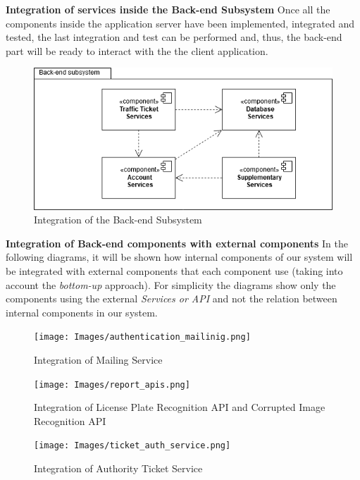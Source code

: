     \noindent\textbf{Integration of services inside the Back-end Subsystem}\newline
Once all the components inside the application server have been implemented, integrated and tested, the last integration and test can be performed and, thus, the back-end part will be ready to interact with the the client application.
    
         \begin{figure}[H]
             \centering
      \includegraphics[width=1\textwidth]{Images/back_end_definitivo.png}
        \caption{Integration of the Back-end Subsystem}
    \end{figure}
\vspace{2mm}
\noindent\textbf{Integration of Back-end components with external components}\newline
In the following diagrams, it will be shown how internal components of our system will be integrated with external components that each component use (taking into account the \textit{bottom-up} approach). For simplicity the diagrams show only the components using the external \textit{Services or API} and not the relation between internal components in our system.\newline
\begin{figure}[H]
             \centering
          \texttt{[image: Images/authentication\_mailinig.png]}
        \caption{Integration of Mailing Service}
    \end{figure}
\begin{figure}[H]
             \centering
          \texttt{[image: Images/report\_apis.png]}
        \caption{Integration of License Plate Recognition API and Corrupted Image Recognition API}
\end{figure}
\begin{figure}[H]
             \centering
          \texttt{[image: Images/ticket\_auth\_service.png]}
        \caption{Integration of Authority Ticket Service}
\end{figure}
